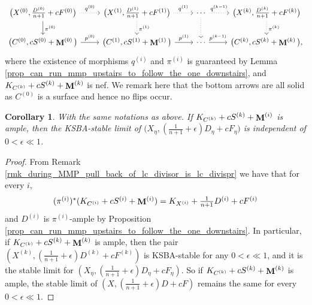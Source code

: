 \documentclass[a4paper,12pt]{amsart}
\DeclareMathOperator{\bfM}{{\bf{M}}}
\newtheorem{corollary}[theorem]{Corollary}
\theoremstyle{definition}
\theoremstyle{remark}
\begin{document}
\begin{equation}\label{eq: diagram of MMP}   
\begin{tikzcd}
	{\big(X^{(0)},\frac{D^{(0)}}{n+1}+cF^{(0)}\big)} & {\big(X^{(1)},\frac{D^{(1)}}{n+1}+cF^{(1)}\big)} & \cdots & {\big(X^{(k)},\frac{D^{(k)}}{n+1}+cF^{(k)}\big)} \\
	{\big(C^{(0)},c S^{(0)}+\bfM^{(0)}\big)} & {\big(C^{(1)},c S^{(1)}+\bfM^{(1)}\big)} & \cdots & {\big(C^{(k)},c S^{(k)}+\bfM^{(k)}\big),}
	\arrow["{q^{(0)}}", dotted, from=1-1, to=1-2]
	\arrow["{\pi^{(0)}}", from=1-1, to=2-1]
	\arrow["{q^{(1)}}", dotted, from=1-2, to=1-3]
	\arrow["{\pi^{(1)}}", dotted, from=1-2, to=2-2]
	\arrow["{q^{(k-1)}}", dotted, from=1-3, to=1-4]
	\arrow[dotted, from=1-3, to=2-3]
	\arrow["{\pi^{(k)}}", dotted, from=1-4, to=2-4]
	\arrow["{p^{(0)}}", from=2-1, to=2-2]
	\arrow["{p^{(1)}}", from=2-2, to=2-3]
	\arrow["{p^{(k-1)}}", from=2-3, to=2-4]
\end{tikzcd}\end{equation} where the existence of morphisms $q^{(i)}$ and $\pi^{(i)}$ is guaranteed by Lemma \ref{prop_can_run_mmp_upstairs_to_follow_the_one_downstairs}, and $K_{C^{(k)}}+cS^{(k)}+\bfM^{(k)}$ is nef. We remark here that the bottom arrows are all solid as $C^{(0)}$ is a surface and hence no flips occur.

\begin{corollary}\label{cor_if_lc_div_on_the_curve_is_ample_its_pull_back_plus_epsilon+D_is_ample}
    With the same notations as above. If $K_{C^{(k)}} +  cS^{(k)}+\bfM^{(i)}$ is ample, then the KSBA-stable limit of $\big(X_\eta,(\frac{1}{n+1} +\epsilon)D_\eta+cF_\eta\big)$ is independent of $0<\epsilon\ll 1$.
\end{corollary}
\begin{proof}
    From Remark \ref{rmk_during_MMP_pull_back_of_lc_divisor_is_lc_divispr} we have that for every $i$,
    \[\textstyle (\pi^{(i)})^*(K_{C^{(i)}}+c S^{(i)}+\bfM^{(i)}) = K_{X^{(i)}}+\frac{1}{n+1}D^{(i)}+cF^{(i)}\] and  $D^{(i)}$ is $\pi^{(i)}$-ample by Proposition \ref{prop_can_run_mmp_upstairs_to_follow_the_one_downstairs}. In particular, if $K_{C^{(k)}} +  cS^{(k)}+\bfM^{(k)}$ is ample, then the pair $(X^{(k)},(\frac{1}{n+1} +\epsilon)D^{(k)}+cF^{(k)})$ is KSBA-stable for any $0<\epsilon\ll 1$, and it is the stable limit for $(X_\eta,(\frac{1}{n+1} +\epsilon)D_\eta+cF_\eta)$. So if $K_{C^{(k)}} +  cS^{(k)}+\bfM^{(k)}$ is ample, the stable limit of $(X,(\frac{1}{n+1} +\epsilon)D+cF)$ remains the same for every $0<\epsilon\ll1$.
\end{proof}
    
\end{document}

